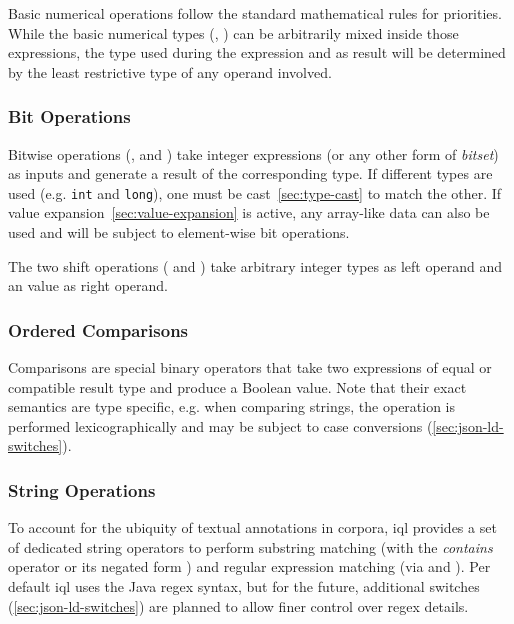 \documentclass[11pt,a4paper]{report}
\begin{document}
Basic numerical operations follow the standard mathematical rules for priorities.
While the basic numerical types (, ) can be arbitrarily mixed inside those expressions, the type used during the expression and as result will be determined by the least restrictive type of any operand involved.

\subsubsection{Bit Operations}
\label{sec:bit-operations}

Bitwise operations (\lit{\&}, \lit{|} and \lit{\textasciicircum}) take integer expressions (or any other form of \textit{bitset}) as inputs and generate a result of the corresponding type. If different types are used (e.g. \texttt{int} and \texttt{long}), one must be cast~\ref{sec:type-cast} to match the other. If value expansion~\ref{sec:value-expansion} is active, any array-like data can also be used and will be subject to element-wise bit operations.

The two shift operations (\lit{\textless{}\textless} and \lit{\textgreater{}\textgreater}) take arbitrary integer types as left operand and an  value as right operand.

\subsubsection{Ordered Comparisons}
\label{sec:ordered-comparisons}

Comparisons are special binary operators that take two expressions of equal or compatible result type and produce a Boolean value. Note that their exact semantics are type specific, e.g. when comparing strings, the operation is performed lexicographically and may be subject to case conversions (\ref{sec:json-ld-switches}).

\subsubsection{String Operations}
\label{sec:string-operations}

To account for the ubiquity of textual annotations in corpora, \ac{iql} provides a set of dedicated string operators to perform substring matching (with the \textit{contains} operator \lit{=\#} or its negated form \lit{!\#}) and regular expression matching (via \lit{=\textasciitilde} and \lit{!\textasciitilde}). Per default \ac{iql} uses the Java regex syntax, but for the future, additional switches (\ref{sec:json-ld-switches}) are planned to allow finer control over regex details.
\end{document}
